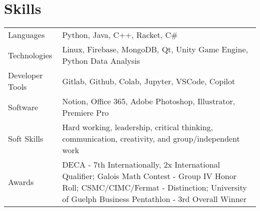 \documentclass[letterpaper,11pt]{article}
\begin{document}
\section{Skills}

\begin{tabularx}{\linewidth}{@{}l@{\hspace{0.5em}}X@{}}
Languages &  \normalsize{Python, Java, C++, Racket, C\#}\\
Technologies  &  \normalsize{Linux,  Firebase, MongoDB, Qt, Unity Game Engine, Python Data Analysis}\\ 
Developer Tools &  \normalsize{Gitlab,  Github, Colab, Jupyter, VSCode, Copilot}\\
Software  &  \normalsize{Notion, Office 365, Adobe Photoshop, Illustrator, Premiere Pro}\\ 
Soft Skills &  \normalsize{Hard working, leadership, critical thinking, communication, creativity, and group/independent work}\\
Awards & \normalsize{DECA - 7th Internationally, 2x International Qualifier; Galois Math Contest - Group IV Honor Roll; CSMC/CIMC/Fermat - Distinction; University of Guelph Business Pentathlon - 3rd Overall Winner}\\
\end{tabularx}

\vfill
{}
\end{document}
